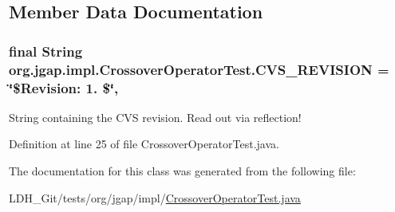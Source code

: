 \subsection{Member Data Documentation}
\hypertarget{classorg_1_1jgap_1_1impl_1_1_crossover_operator_test_a1180c6a35312f0980ba5da290657cd15}{
\subsubsection[{C\-V\-S\-\_\-\-R\-E\-V\-I\-S\-I\-O\-N}]{\setlength{\rightskip}{0pt plus 5cm}final String org.\-jgap.\-impl.\-Crossover\-Operator\-Test.\-C\-V\-S\-\_\-\-R\-E\-V\-I\-S\-I\-O\-N = \char`\"{}\$Revision\-: 1. \$\char`\"{}\hspace{0.3cm}{\ttfamily [static]}, {\ttfamily [private]}}}\label{classorg_1_1jgap_1_1impl_1_1_crossover_operator_test_a1180c6a35312f0980ba5da290657cd15}
String containing the C\-V\-S revision. Read out via reflection! 

Definition at line 25 of file Crossover\-Operator\-Test.\-java.



The documentation for this class was generated from the following file\-:\begin{DoxyCompactItemize}
\item 
L\-D\-H\-\_\-\-Git/tests/org/jgap/impl/\hyperlink{_crossover_operator_test_8java}{Crossover\-Operator\-Test.\-java}\end{DoxyCompactItemize}
